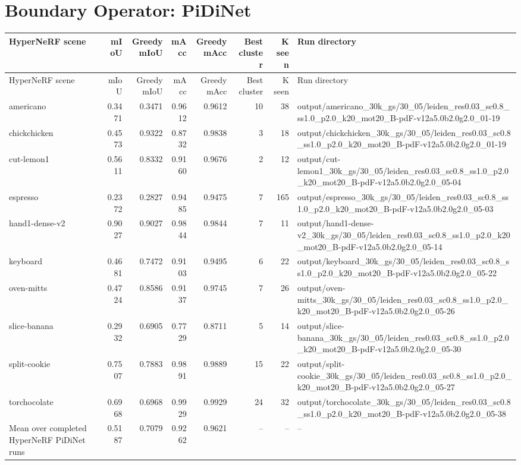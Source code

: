 \documentclass[10pt]{article}
\begin{document}
\normalsize

\section{Boundary Operator: PiDiNet}
\small
\begin{longtable}{lrrrrrrp{9cm}}
\toprule
HyperNeRF scene & mIoU & Greedy mIoU & mAcc & Greedy mAcc & Best cluster & K seen & Run directory \\
\midrule
\endfirsthead
\toprule
HyperNeRF scene & mIoU & Greedy mIoU & mAcc & Greedy mAcc & Best cluster & K seen & Run directory \\
\midrule
\endhead
americano & 0.3471 & 0.3471 & 0.9612 & 0.9612 & 10 & 38 & output/americano\_30k\_gs/30\_05/leiden\_res0.03\_sc0.8\_ss1.0\_p2.0\_k20\_mot20\_B-pdF-v12a5.0b2.0g2.0\_01-19 \\
chickchicken & 0.4573 & 0.9322 & 0.8732 & 0.9838 & 3 & 18 & output/chickchicken\_30k\_gs/30\_05/leiden\_res0.03\_sc0.8\_ss1.0\_p2.0\_k20\_mot20\_B-pdF-v12a5.0b2.0g2.0\_01-19 \\
cut-lemon1 & 0.5611 & 0.8332 & 0.9160 & 0.9676 & 2 & 12 & output/cut-lemon1\_30k\_gs/30\_05/leiden\_res0.03\_sc0.8\_ss1.0\_p2.0\_k20\_mot20\_B-pdF-v12a5.0b2.0g2.0\_05-04 \\
espresso & 0.2372 & 0.2827 & 0.9485 & 0.9475 & 7 & 165 & output/espresso\_30k\_gs/30\_05/leiden\_res0.03\_sc0.8\_ss1.0\_p2.0\_k20\_mot20\_B-pdF-v12a5.0b2.0g2.0\_05-03 \\
hand1-dense-v2 & 0.9027 & 0.9027 & 0.9844 & 0.9844 & 7 & 11 & output/hand1-dense-v2\_30k\_gs/30\_05/leiden\_res0.03\_sc0.8\_ss1.0\_p2.0\_k20\_mot20\_B-pdF-v12a5.0b2.0g2.0\_05-14 \\
keyboard & 0.4681 & 0.7472 & 0.9103 & 0.9495 & 6 & 22 & output/keyboard\_30k\_gs/30\_05/leiden\_res0.03\_sc0.8\_ss1.0\_p2.0\_k20\_mot20\_B-pdF-v12a5.0b2.0g2.0\_05-22 \\
oven-mitts & 0.4724 & 0.8586 & 0.9137 & 0.9745 & 7 & 26 & output/oven-mitts\_30k\_gs/30\_05/leiden\_res0.03\_sc0.8\_ss1.0\_p2.0\_k20\_mot20\_B-pdF-v12a5.0b2.0g2.0\_05-26 \\
slice-banana & 0.2932 & 0.6905 & 0.7729 & 0.8711 & 5 & 14 & output/slice-banana\_30k\_gs/30\_05/leiden\_res0.03\_sc0.8\_ss1.0\_p2.0\_k20\_mot20\_B-pdF-v12a5.0b2.0g2.0\_05-30 \\
split-cookie & 0.7507 & 0.7883 & 0.9891 & 0.9889 & 15 & 22 & output/split-cookie\_30k\_gs/30\_05/leiden\_res0.03\_sc0.8\_ss1.0\_p2.0\_k20\_mot20\_B-pdF-v12a5.0b2.0g2.0\_05-27 \\
torchocolate & 0.6968 & 0.6968 & 0.9929 & 0.9929 & 24 & 32 & output/torchocolate\_30k\_gs/30\_05/leiden\_res0.03\_sc0.8\_ss1.0\_p2.0\_k20\_mot20\_B-pdF-v12a5.0b2.0g2.0\_05-38 \\
Mean over completed HyperNeRF PiDiNet runs & 0.5187 & 0.7079 & 0.9262 & 0.9621 & -- & -- & -- \\
\bottomrule
\end{longtable}
\normalsize
\end{document}

